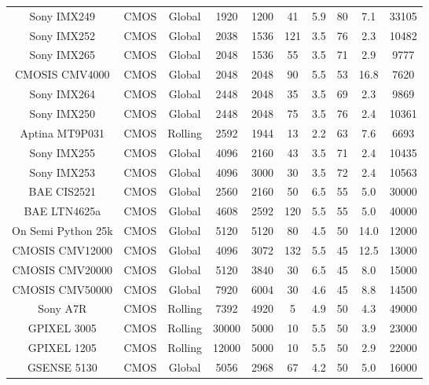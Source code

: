 \begin{table}[t]
{\begin{tabular}{cccccccccc}
Sony IMX249 & CMOS & Global & 1920 & 1200 & 41 & 5.9 & 80 & 7.1 & 33105\\ 
Sony IMX252 & CMOS & Global & 2038 & 1536 & 121 & 3.5 & 76 & 2.3 & 10482\\ 
Sony IMX265 & CMOS & Global & 2048 & 1536 & 55 & 3.5 & 71 & 2.9 & 9777\\ 
CMOSIS CMV4000 & CMOS & Global & 2048 & 2048 & 90 & 5.5 & 53 & 16.8 & 7620\\ 
Sony IMX264 & CMOS & Global & 2448 & 2048 & 35 & 3.5 & 69 & 2.3 & 9869\\ 
Sony IMX250 & CMOS & Global & 2448 & 2048 & 75 & 3.5 & 76 & 2.4 & 10361\\ 
Aptina MT9P031 & CMOS & Rolling & 2592 & 1944 & 13 & 2.2 & 63 & 7.6 & 6693\\ 
Sony IMX255 & CMOS & Global & 4096 & 2160 & 43 & 3.5 & 71 & 2.4 & 10435\\ 
Sony IMX253 & CMOS & Global & 4096 & 3000 & 30 & 3.5 & 72 & 2.4 & 10563\\ 
BAE CIS2521 & CMOS & Global & 2560 & 2160 & 50 & 6.5 & 55 & 5.0 & 30000\\ 
BAE LTN4625a & CMOS & Global & 4608 & 2592 & 120 & 5.5 & 55 & 5.0 & 40000\\ 
On Semi Python 25k & CMOS & Global & 5120 & 5120 & 80 & 4.5 & 50 & 14.0 & 12000\\ 
CMOSIS CMV12000 & CMOS & Global & 4096 & 3072 & 132 & 5.5 & 45 & 12.5 & 13000\\ 
CMOSIS CMV20000 & CMOS & Global & 5120 & 3840 & 30 & 6.5 & 45 & 8.0 & 15000\\ 
CMOSIS CMV50000 & CMOS & Global & 7920 & 6004 & 30 & 4.6 & 45 & 8.8 & 14500\\ 
Sony A7R & CMOS & Rolling & 7392 & 4920 & 5 & 4.9 & 50 & 4.3 & 49000\\ 
GPIXEL 3005 & CMOS & Rolling & 30000 & 5000 & 10 & 5.5 & 50 & 3.9 & 23000\\ 
GPIXEL 1205 & CMOS & Rolling & 12000 & 5000 & 10 & 5.5 & 50 & 2.9 & 22000\\ 
GSENSE 5130 & CMOS & Global & 5056 & 2968 & 67 & 4.2 & 50 & 5.0 & 16000\\ 

\end{tabular}%
}
\label{table:all_sensors}
\end{table}

